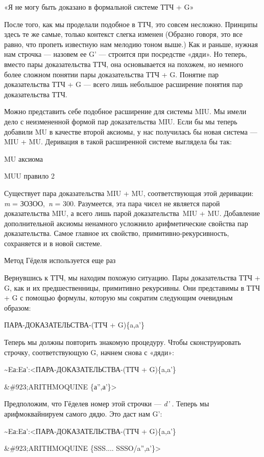 «Я не могу быть доказано в формальной системе ТТЧ + G»

После того, как мы проделали подобное в ТТЧ, это совсем несложно. Принципы здесь те же самые, только контекст слегка изменен (Образно говоря, это все равно, что пропеть известную нам мелодию тоном выше.) Как и раньше, нужная нам строчка --- назовем ее G' --- строится при посредстве «дяди». Но теперь, вместо пары доказательства ТТЧ, она основывается на похожем, но немного более сложном понятии пары доказательства ТТЧ + G. Понятие пар доказательства ТТЧ + G --- всего лишь небольшое расширение понятия пар доказательства ТТЧ.

Можно представить себе подобное расширение для системы MIU. Мы имели дело с неизмененной формой пар доказательства MIU. Если бы мы теперь добавили MU в качестве второй аксиомы, у нас получилась бы новая система --- MIU + MU. Деривация в такой расширенной системе выглядела бы так:

MU аксиома

MUU правило 2

Существует пара доказательства MIU + MU, соответствующая этой деривации: \emph{m} = ЗОЗОО,~\emph{n} = 300. Разумеется, эта пара чисел не является парой доказательства MIU, а всего лишь парой доказательства~MIU + MU. Добавление дополнительной аксиомы ненамного усложнило арифметические свойства пар доказательства. Самое главное их свойство, примитивно-рекурсивность, сохраняется и в новой системе.

Метод Гёделя используется еще раз

Вернувшись к ТТЧ, мы находим похожую ситуацию. Пары доказательства ТТЧ + G, как и их предшественницы, примитивно рекурсивны. Они представимы в ТТЧ + G с помощью формулы, которую мы сократим следующим очевидным образом:

ПАРА-ДОКАЗАТЕЛЬСТВА-(ТТЧ + G)\{a,a'\}

Теперь мы должны повторить знакомую процедуру. Чтобы сконструировать строчку, соответствующую G, начнем снова с «дяди»:

\textasciitilde Eа:Eа':\textless ПАРА-ДОКАЗАТЕЛЬСТВА-(ТТЧ + G)\{a,a'\}

\&\#923;ARITHMOQUINE \{а'',а'\}\textgreater{}

Предположим, что Гёделев номер этой строчки --- \emph{d'} . Теперь мы арифмоквайнируем самого дядю. Это даст нам G':

\textasciitilde Eа:Eа':\textless ПАРА-ДОКАЗАТЕЛЬСТВА-(ТТЧ + G)\{a,a'\}

\&\#923;ARITHMOQUINE \{SSS.... SSSO/a'',a'\}\textgreater{}


